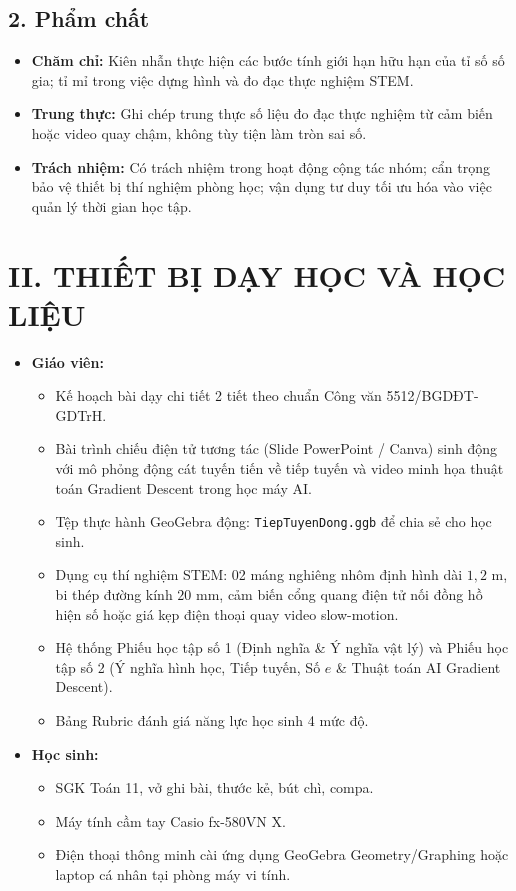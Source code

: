 \documentclass[12pt, a4paper]{article}
\begin{document}
\subsection*{2. Phẩm chất}

\begin{itemize}[leftmargin=1.2cm]
    \item \textbf{Chăm chỉ:} Kiên nhẫn thực hiện các bước tính giới hạn hữu hạn của tỉ số số gia; tỉ mỉ trong việc dựng hình và đo đạc thực nghiệm STEM.
    \item \textbf{Trung thực:} Ghi chép trung thực số liệu đo đạc thực nghiệm từ cảm biến hoặc video quay chậm, không tùy tiện làm tròn sai số.
    \item \textbf{Trách nhiệm:} Có trách nhiệm trong hoạt động cộng tác nhóm; cẩn trọng bảo vệ thiết bị thí nghiệm phòng học; vận dụng tư duy tối ưu hóa vào việc quản lý thời gian học tập.
\end{itemize}

\section*{II. THIẾT BỊ DẠY HỌC VÀ HỌC LIỆU}

\begin{itemize}[leftmargin=1.2cm]
    \item \textbf{Giáo viên:}
    \begin{itemize}[leftmargin=0.6cm]
        \item Kế hoạch bài dạy chi tiết 2 tiết theo chuẩn Công văn 5512/BGDĐT-GDTrH.
        \item Bài trình chiếu điện tử tương tác (Slide PowerPoint / Canva) sinh động với mô phỏng động cát tuyến tiến về tiếp tuyến và video minh họa thuật toán Gradient Descent trong học máy AI.
        \item Tệp thực hành GeoGebra động: \texttt{TiepTuyenDong.ggb} để chia sẻ cho học sinh.
        \item Dụng cụ thí nghiệm STEM: 02 máng nghiêng nhôm định hình dài $1{,}2\text{ m}$, bi thép đường kính $20\text{ mm}$, cảm biến cổng quang điện tử nối đồng hồ hiện số hoặc giá kẹp điện thoại quay video slow-motion.
        \item Hệ thống Phiếu học tập số 1 (Định nghĩa & Ý nghĩa vật lý) và Phiếu học tập số 2 (Ý nghĩa hình học, Tiếp tuyến, Số $e$ & Thuật toán AI Gradient Descent).
        \item Bảng Rubric đánh giá năng lực học sinh 4 mức độ.
    \end{itemize}
    \item \textbf{Học sinh:}
    \begin{itemize}[leftmargin=0.6cm]
        \item SGK Toán 11, vở ghi bài, thước kẻ, bút chì, compa.
        \item Máy tính cầm tay Casio fx-580VN X.
        \item Điện thoại thông minh cài ứng dụng GeoGebra Geometry/Graphing hoặc laptop cá nhân tại phòng máy vi tính.
    \end{itemize}
\end{itemize}
\end{document}
